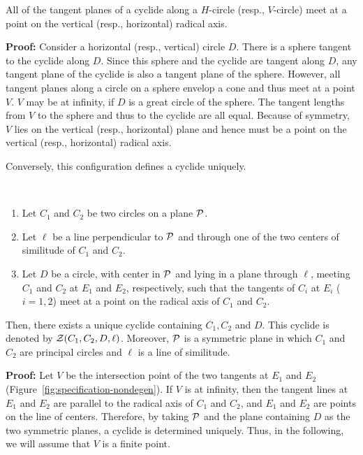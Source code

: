\begin{lemma}
\label{lemma:on-radical-axis}
     All of the tangent planes of a cyclide along a $H$-circle 
(resp., $V$-circle) meet at a point on the vertical (resp., horizontal)
radical axis.
\end{lemma}
{\bf Proof:}  Consider a horizontal (resp., vertical) circle $D$.  There is a
sphere tangent to the cyclide along $D$.  Since this sphere and the cyclide are
tangent along $D$, any tangent plane of the cyclide is also a tangent plane of
the sphere.  However, all tangent planes along a circle on a sphere envelop a
cone and thus meet at a point $V$.  $V$ may be at
infinity, if $D$ is a great circle of the sphere.  The tangent lengths from
$V$ to the sphere and thus to the cyclide are all equal.  Because of symmetry,
$V$ lies on the vertical (resp., horizontal) plane and hence must be a point
on the vertical (resp., horizontal) radical axis. \QED

     Conversely, this configuration defines a cyclide uniquely.

\begin{lemma}
\label{lemma:non-degen-construction} \ \\
\begin{enumerate}
     \item Let $C_1$ and $C_2$ be two circles on a plane ${\cal P}$.
     \item Let $\ell$ be a line perpendicular to ${\cal P}$ and through one of
          the two centers of similitude of $C_1$ and $C_2$.  
     \item Let $D$ be a circle, with center in ${\cal P}$ and lying in a plane
          through $\ell$, meeting $C_1$ and $C_2$ at $E_1$ and $E_2$, 
          respectively, such that the tangents of $C_i$ at $E_i$ ($i=1,2$) 
          meet at a point on the radical axis of $C_1$ and $C_2$.  
\end{enumerate}
Then, there exists a unique cyclide containing $C_1,C_2$ and $D$.  This cyclide
is denoted by ${\cal Z}(C_1,C_2,D,\ell)$.  Moreover, ${\cal P}$ is 
a symmetric plane in which $C_1$ and $C_2$ are principal circles and $\ell$ is
a line of similitude.
\end{lemma}
{\bf Proof:}  Let $V$ be the intersection point of the two tangents at $E_1$
and $E_2$ (Figure~\ref{fig:specification-nondegen}).  
If $V$ is at infinity, then the tangent lines at $E_1$ and $E_2$ are parallel 
to the radical axis of $C_1$ and $C_2$, and $E_1$ and $E_2$ are points on the
line of centers.  Therefore, by taking ${\cal P}$ and the plane containing 
$D$ as the two symmetric planes, a cyclide is determined uniquely.  Thus, in
the following, we will assume that $V$ is a finite point.

